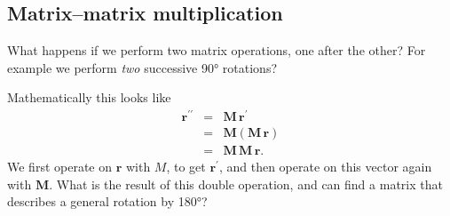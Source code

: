 \documentclass[a4paper]{article}
\newcommand{\bvec}[1]{\mathbf{#1}}
\begin{document}
\subsection{Matrix--matrix multiplication}
What happens if we perform two matrix operations, one after the other? For example we perform \emph{two} successive \ang{90} rotations?

Mathematically this looks like
\begin{eqnarray*}
\bvec{r^{\prime\prime}}&=&\bvec{M}\,\bvec{r^\prime} \\
& = & \bvec{M}\left(\bvec{M}\,\bvec{r}\right) \\
& = & \bvec{M}\,\bvec{M}\,\bvec{r}.
\end{eqnarray*}
We first operate on $\bvec{r}$ with $M$, to get $\bvec{r^\prime}$, and then operate on this vector again with $\bvec{M}$. What is the result of this double operation, and can find a matrix that describes a general rotation by \ang{180}?
\end{document}
